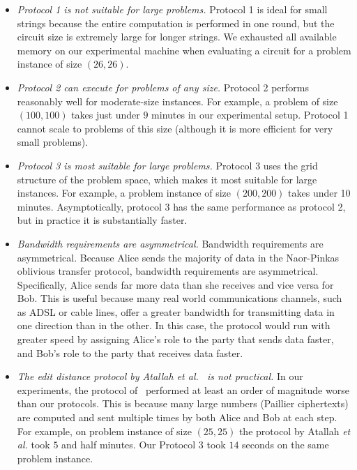 \begin{itemize}

\item \textit{Protocol 1 is not suitable for large problems.} 
Protocol 1 is ideal for small strings because the entire computation is
performed in one round, but the circuit size is extremely large for longer
strings.  We exhausted all available memory on our experimental machine
when evaluating a circuit for a problem instance of size $(26,26)$.

\item \textit{Protocol 2 can execute for problems of any size.} 
Protocol 2 performs reasonably well for moderate-size instances.
For example, a problem of size $(100,100)$ takes just under $9$ minutes
in our experimental setup.  Protocol 1 cannot scale to problems of
this size (although it is more efficient for very small problems).


\item \textit{Protocol 3 is most suitable for large problems.} 
Protocol 3 uses the grid structure of the problem space, which makes it
most suitable for large instances.  For example, a problem instance of
size $(200,200)$ takes under 10 minutes.  Asymptotically, protocol 3 has
the same performance as protocol 2, but in practice it is substantially
faster.  
\item \textit{Bandwidth requirements are asymmetrical.} 
Bandwidth requirements are asymmetrical.  Because Alice sends the
majority of data in the Naor-Pinkas~\cite{Naor-Pinkas:2001} oblivious
transfer protocol, bandwidth requirements are asymmetrical.
Specifically, Alice sends far more data than she receives and vice
versa for Bob.  This is useful because many real world communications
channels, such as ADSL or cable lines, offer a greater bandwidth for
transmitting data in one direction than in the other.  In this case,
the protocol would run with greater speed by assigning Alice's role to
the party that sends data faster, and Bob's role to the party that
receives data faster.


\item \textit{The edit distance protocol by Atallah et al.~\cite{atallah}
is not practical.} 
In our experiments, the protocol of~\cite{atallah} performed at least an
order of magnitude worse than our protocols.  This is because many large
numbers (Paillier ciphertexts) are computed and sent multiple times by
both Alice and Bob at each step.  For example, on problem instance of
size $(25,25)$ the protocol by Atallah \textit{et al.} took $5$ and half
minutes.  Our Protocol $3$ took $14$ seconds on the same problem instance.

\end{itemize}

